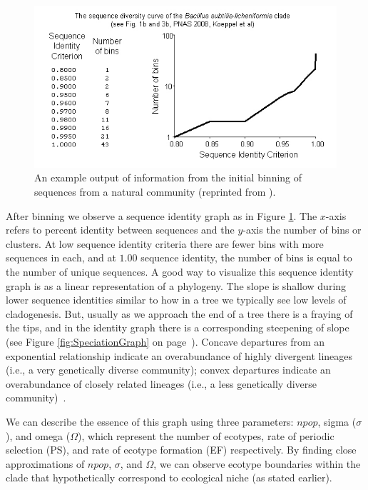\begin{figure}[h!]
 \centering
 \label{fig:Binning}
 \includegraphics[scale=1.75]{images/Binning-CH2}
 \caption[Sequence identity graph and example output produced by binning.]{An example output of information from the initial binning of sequences from a natural community (reprinted from \protect\cite{koeppel2008identifying}). }
  \label{fig:Binning}
\end{figure}

After binning we observe a sequence identity graph as in Figure \ref{fig:Binning}.
The $x$-axis refers to percent identity between sequences and the $y$-axis the number of bins or clusters.
At low sequence identity criteria there are fewer bins with more sequences in each, and at $1.00$ sequence identity, the number of bins is equal to the number of unique sequences.
A good way to visualize this sequence identity graph is as a linear representation of a phylogeny.
The slope is shallow during lower sequence identities similar to how in a tree we typically see low levels of cladogenesis.
But, usually as we approach the end of a tree there is a fraying of the tips, and in the identity graph there is a corresponding steepening of slope (see Figure \ref{fig:SpeciationGraph} on page~\pageref{fig:SpeciationGraph}).
Concave departures from an exponential relationship indicate an overabundance of highly divergent lineages (i.e., a very genetically diverse community); convex departures indicate an overabundance of closely related lineages (i.e., a less genetically diverse community)~\cite{bohannan2003new}.

We can describe the essence of this graph using three parameters: $npop$, sigma ($\sigma$), and omega ($\Omega$), which represent the number of ecotypes, rate of periodic selection (PS), and rate of ecotype formation (EF) respectively.
By finding close approximations of $npop$, $\sigma$, and $\Omega$, we can observe ecotype boundaries within the clade that hypothetically correspond to ecological niche (as stated earlier).

